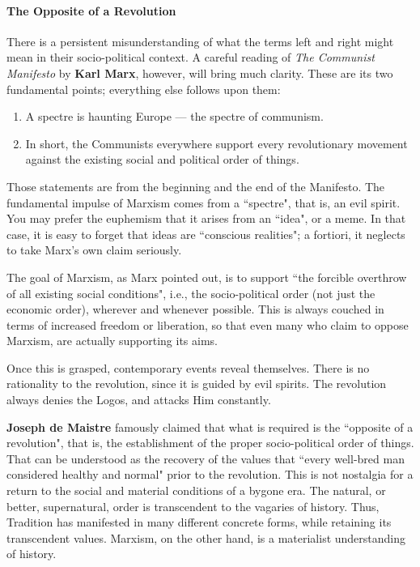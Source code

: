 \paragraph{The Opposite of a Revolution}
There is a persistent misunderstanding of what the terms left and right might mean in their socio-political context. A careful reading of \emph{The Communist Manifesto} by \textbf{Karl Marx}, however, will bring much clarity. These are its two fundamental points; everything else follows upon them:

\begin{enumerate}
\item A spectre is haunting Europe — the spectre of communism. 
\item In short, the Communists everywhere support every revolutionary movement against the existing social and political order of things. 
\end{enumerate}
Those statements are from the beginning and the end of the Manifesto. The fundamental impulse of Marxism comes from a ``spectre", that is, an evil spirit. You may prefer the euphemism that it arises from an ``idea", or a meme. In that case, it is easy to forget that ideas are ``conscious realities"; a fortiori, it neglects to take Marx's own claim seriously.

The goal of Marxism, as Marx pointed out, is to support ``the forcible overthrow of all existing social conditions", i.e., the socio-political order (not just the economic order), wherever and whenever possible. This is always couched in terms of increased freedom or liberation, so that even many who claim to oppose Marxism, are actually supporting its aims.

Once this is grasped, contemporary events reveal themselves. There is no rationality to the revolution, since it is guided by evil spirits. The revolution always denies the Logos, and attacks Him constantly.

\textbf{Joseph de Maistre} famously claimed that what is required is the ``opposite of a revolution", that is, the establishment of the proper socio-political order of things. That can be understood as the recovery of the values that ``every well-bred man considered healthy and normal" prior to the revolution. This is not nostalgia for a return to the social and material conditions of a bygone era. The natural, or better, supernatural, order is transcendent to the vagaries of history. Thus, Tradition has manifested in many different concrete forms, while retaining its transcendent values. Marxism, on the other hand, is a materialist understanding of history.

